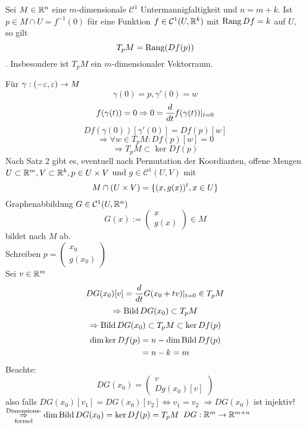 \documentclass[../ana2.tex]{subfiles}
\begin{document}
\begin{lem}
    Sei \( M \in \mathbb{R}^n \) eine \(m\)-dimensionale 
    \( \mathcal{C}^1 \) Untermannigfaltigkeit  und \(n = m + k\).
    Ist \( p \in M \cap U = f^{-1}(0) \) für eine
    Funktion \( f \in \mathcal{C}^1(U, \mathbb{R}^k) \) mit 
    \( \operatorname{Rang} Df = k \) auf \(U\),
    so gilt 
    \[ T_p M = \operatorname{Rang}(Df(p))\].
    Insbesondere ist \( T_p M \) ein \(m\)-dimensionaler 
    Vektorraum.
\end{lem}
\begin{bew}
    Für \(\gamma:(-\varepsilon, \varepsilon)\rightarrow M\)
    \[ \gamma(0) = p, \gamma'(0) = w \]
    \[ f(\gamma(t)) = 0 \Rightarrow 0 = \frac{d}{dt}f(\gamma(t))\vert_{t=0} \]
    \[ Df(\gamma(0))[\gamma'(0)] = Df(p)[w] \]
    \[ \Rightarrow \forall w \in T_p M: Df(p)[w] = 0 \]
    \[ \Rightarrow T_pM \subset \ker Df(p) \]
    Nach Satz 2 gibt es, eventuell nach Permutation der Koordianten, offene Mengen
    \(U \subset \mathbb{R}^m, V \subset \mathbb{R}^k, p \in U \times V\) und
    \(g \in \mathcal{C}^1(U, V) \) mit
    \[ M \cap (U \times V) = \{(x, g(x))^t, x \in U\} \]
    Graphenabbildung \( G \in \mathcal{C}^1(U, \mathbb{R}^n) \)
    \[ G(x) := \begin{pmatrix}
        x \\ g(x) 
    \end{pmatrix} \in M \]
    bildet nach \(M\) ab.\\
    Schreiben \(p = \begin{pmatrix}
        x_0 \\
        g(x_0)
    \end{pmatrix} \)\\
    Sei \(v \in \mathbb{R}^m\)
    \[ DG(x_0)[v] = \frac{d}{dt} G(x_0+tv) \vert_{t=0} \in T_pM \]
    \[ \Rightarrow \operatorname{Bild} DG(x_0) \subset T_p M\]
    \[ \Rightarrow \operatorname{Bild} DG(x_0) \subset T_pM \subset \ker Df(p) \]
    \begin{align*}
        \dim \ker Df(p) &= n - \dim \operatorname{Bild} Df(p) \\
        &= n -k = m
    \end{align*}
    Beachte: 
    \[DG(x_0) = \begin{pmatrix}
        v \\
        D g(x_0)[v]
    \end{pmatrix}  \]
    also falls \( DG(x_0)[v_1] 
    = D G(x_0)[v_2] \Leftrightarrow v_1 = v_2 \)
    \(\Rightarrow D G(x_0) \) ist injektiv!
    \(\overset{\text{Dimensions-}}{\underset{\text{formel}}{\Rightarrow}} 
    \dim \operatorname{Bild} DG(x_0) = \ker Df(p) = T_pM\)
    \( DG:\mathbb{R}^m\rightarrow \mathbb{R}^{m+n} \)
\end{bew}
\end{document}
